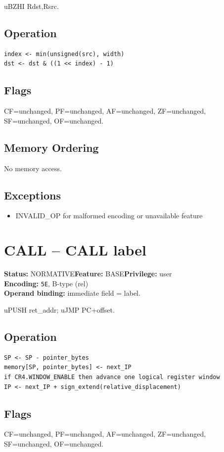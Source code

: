\documentclass[10pt]{article}
\begin{document}
uBZHI Rdst,Rsrc.

\subsection*{Operation}
\begin{lstlisting}
index <- min(unsigned(src), width)
dst <- dst & ((1 << index) - 1)
\end{lstlisting}
\subsection*{Flags}
CF=unchanged, PF=unchanged, AF=unchanged, ZF=unchanged, SF=unchanged, OF=unchanged.
\subsection*{Memory Ordering}
No memory access.
\subsection*{Exceptions}
\begin{itemize}
\item INVALID\_OP for malformed encoding or unavailable feature
\end{itemize}
\clearpage

\section{CALL -- CALL label}
\textbf{Status:} NORMATIVE\quad \textbf{Feature:} BASE\quad \textbf{Privilege:} user\\
\textbf{Encoding:} \texttt{5E}, B-type (rel)\\
\textbf{Operand binding:} immediate field = label.

uPUSH ret\_addr; uJMP PC+offset.

\subsection*{Operation}
\begin{lstlisting}
SP <- SP - pointer_bytes
memory[SP, pointer_bytes] <- next_IP
if CR4.WINDOW_ENABLE then advance one logical register window
IP <- next_IP + sign_extend(relative_displacement)
\end{lstlisting}
\subsection*{Flags}
CF=unchanged, PF=unchanged, AF=unchanged, ZF=unchanged, SF=unchanged, OF=unchanged.
\end{document}
